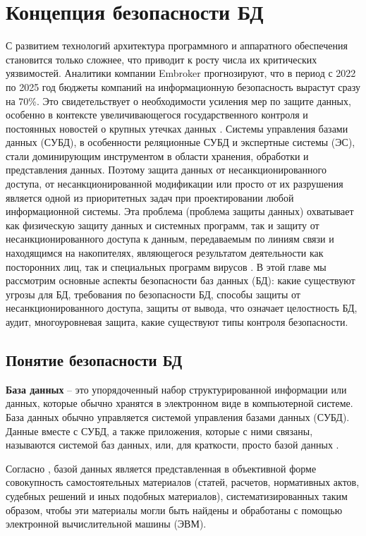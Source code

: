 \section{Концепция безопасности БД}
С развитием технологий архитектура программного и аппаратного обеспечения становится только сложнее, что приводит к росту числа их критических уязвимостей. Аналитики компании Embroker прогнозируют, что в период с 2022 по 2025 год бюджеты компаний на информационную безопасность вырастут сразу на 70\%. Это свидетельствует о необходимости усиления мер по защите данных, особенно в контексте увеличивающегося государственного контроля и постоянных новостей о крупных утечках данных \autocite{DataProtectionMaterials}.
Системы управления базами данных (СУБД), в особенности реляционные СУБД и экспертные системы (ЭС), стали доминирующим инструментом в области хранения, обработки и представления данных. Поэтому защита данных от несанкционированного доступа, от несанкционированной модификации или просто от их разрушения является одной из приоритетных задач при проектировании любой информационной системы. Эта проблема (проблема защиты данных) охватывает как физическую защиту данных и системных программ, так и защиту от несанкционированного доступа к данным, передаваемым по линиям связи и находящимся на накопителях, являющегося результатом деятельности как посторонних лиц, так и специальных программ вирусов \autocite[с. 6]{Skakun}.
В этой главе мы рассмотрим основные аспекты безопасности баз данных (БД): какие существуют угрозы для БД, требования по безопасности БД, способы защиты от несанкционированного доступа, защиты от вывода, что означает целостность БД, аудит, многоуровневая защита, какие существуют типы контроля безопасности.

\subsection{Понятие безопасности БД}

\begin{grayquote}
	\textbf{База данных} -- это упорядоченный набор структурированной информации или данных, которые обычно хранятся в электронном виде в компьютерной системе. База данных обычно управляется системой управления базами данных (СУБД). Данные вместе с СУБД, а также приложения, которые с ними связаны, называются системой баз данных, или, для краткости, просто базой данных \autocite{oracleWhatIsDatabase}.
\end{grayquote}


\begin{grayquote}
	Согласно \autocite{CCRFPart4}, базой данных является представленная в объективной форме совокупность самостоятельных материалов (статей, расчетов, нормативных актов, судебных решений и иных подобных материалов), систематизированных таким образом, чтобы эти материалы могли быть найдены и обработаны с помощью электронной вычислительной машины (ЭВМ).
\end{grayquote}

